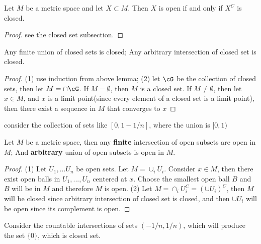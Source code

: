\begin{refsection}
\begin{theorem}
	\cite[134]{johnsonbaugh2010foundations}Let $M$ be a metric space and let $X\subset M$. Then $X$ is open if and only if $X^C$ is closed. 
\end{theorem}
\begin{proof}
	see the closed set subsection.
\end{proof}

\begin{theorem}\cite[130]{johnsonbaugh2010foundations}
	Any finite union of closed sets is closed; Any arbitrary intersection of closed set is closed.
\end{theorem}
\begin{proof}
	(1) use induction from above lemma; (2) let $\cG$ be the collection of closed sets, then let $M = \cap \cG$. If $M=\emptyset$, then $M$ is a closed set. If $M\neq \emptyset$, then let $x\in M$, and $x$ is a limit point(since every element of a closed set is a limit point), then there exist a sequence in $M$ that converges to $x$
\end{proof}

\begin{remark}
	consider the collection of sets like $[0,1-1/n]$, where the union is $[0,1)$
\end{remark}



\begin{theorem}\cite[134]{johnsonbaugh2010foundations}
	Let $M$ be a metric space, then any \textbf{finite} intersection of open subsets are open in $M$; And \textbf{arbitrary} union of open subsets is open in $M$.
\end{theorem}
\begin{proof}
	(1) Let $U_1,...U_n$ be open sets. Let $M = \cup_i U_i$. Consider $x\in M$, then there exist open balls in $U_1,...,U_n$ centered at $x$. Choose the smallest open ball $B$ and $B$ will be in $M$ and therefore $M$ is open. (2) Let  $M = \cap_i U_i^C = (\cup U_i)^C$, then $M$ will be closed since arbitrary intersection of closed set is closed, and then $\cup U_i$ will be open since its complement is open.
\end{proof}

\begin{remark}
	Consider the countable intersections of sets $(-1/n,1/n)$, which will produce the set $\{0 \}$, which is closed set.
\end{remark}



\end{refsection}
